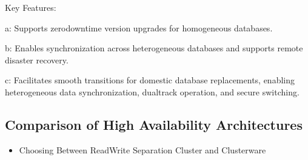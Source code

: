 \documentclass[letterpaper,10pt,english]{sphinxmanual}
\begin{document}
\sphinxAtStartPar
Key Features:

\sphinxAtStartPar
a: Supports zero\sphinxhyphen{}downtime version upgrades for homogeneous databases.

\sphinxAtStartPar
b: Enables synchronization across heterogeneous databases and supports remote disaster recovery.

\sphinxAtStartPar
c: Facilitates smooth transitions for domestic database replacements, enabling heterogeneous data synchronization, dual\sphinxhyphen{}track operation, and secure switching.


\subsection{Comparison of High Availability Architectures}
\label{\detokenize{highly-availability-3-en:comparison-of-high-availability-architectures}}\begin{itemize}
\item {} 
\sphinxAtStartPar
Choosing Between Read\sphinxhyphen{}Write Separation Cluster and Clusterware

\end{itemize}
\end{document}
